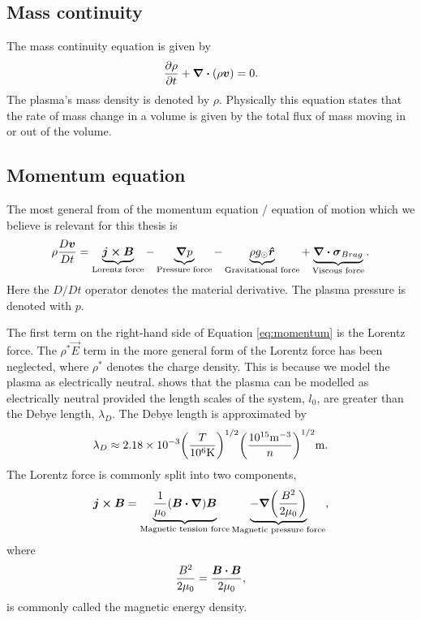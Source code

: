 \subsection{Mass continuity}

The mass continuity equation is given by
\begin{equation}
    \label{eq:mass_continuity}
    \pdv{\rho}{t}+\div(\rho\boldsymbol{v})=0.
\end{equation}
The plasma's mass density is denoted by $\rho$. Physically this equation states that the rate of mass change in a volume is given by the total flux of mass moving in or out of the volume.

\subsection{Momentum equation}
The most general from of the momentum equation / equation of motion which we believe is relevant for this thesis is
\begin{equation}
    \label{eq:momentum}
    \rho\frac{D\boldsymbol{v}}{Dt}=\underbrace{\boldsymbol{j}\cross\boldsymbol{B}}_{\text{Lorentz force}}-\underbrace{\grad p}_{\text{Pressure force}}-\underbrace{\rho g_\odot \boldsymbol{\hat{r}}}_{\text{Gravitational force}}+\underbrace{\div\boldsymbol{\sigma}_{Brag}}_{\text{Viscous force}}.
\end{equation}
Here the $D/Dt$ operator denotes the material derivative. The plasma pressure is denoted with $p$.

The first term on the right-hand side of Equation \eqref{eq:momentum} is the Lorentz force. The $\rho^*\vec{E}$ term in the more general form of the Lorentz force has been neglected, where $\rho^*$ denotes the charge density. This is because we model the plasma as electrically neutral. \citet{Priest2014} shows that the plasma can be modelled as electrically neutral provided the length scales of the system, $l_0$, are greater than the Debye length, $\lambda_D$. The Debye length is approximated by
\begin{equation}
    \lambda_D\approx2.18\times10^{-3}\qty(\frac{T}{10^6\si{.K}})^{1/2}\qty(\frac{10^{15}\si{.m^{-3}}}{n})^{1/2}\si{.m}.
\end{equation}
The Lorentz force is commonly split into two components,
\begin{equation}
    \vec{j}\cross\vec{B}=\underbrace{\frac{1}{\mu_0}(\vec{B}\vdot\grad)\vec{B}}_{\text{Magnetic tension force}}\underbrace{-\grad\qty(\frac{B^2}{2\mu_0})}_{\text{Magnetic pressure force}},
\end{equation}
where 
\[\frac{B^2}{2\mu_0}=\frac{\vec{B}\vdot\vec{B}}{2\mu_0},\]
is commonly called the magnetic energy density.

